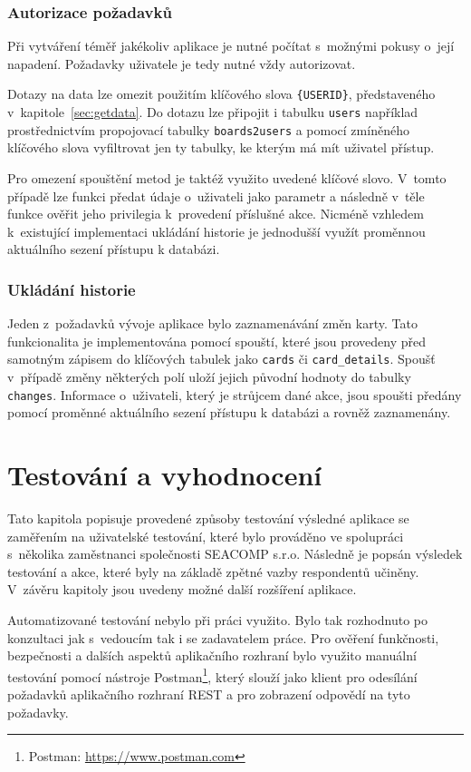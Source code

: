 \subsection{Autorizace požadavků}
Při vytváření téměř jakékoliv aplikace je nutné počítat s~možnými pokusy o~její napadení. Požadavky uživatele je tedy nutné vždy autorizovat. 

Dotazy na data lze omezit použitím klíčového slova \texttt{\{USERID\}}, představeného v~kapitole~\ref{sec:getdata}. Do dotazu lze připojit i tabulku \texttt{users} například prostřednictvím propojovací tabulky \texttt{boards2users} a pomocí zmíněného klíčového slova vyfiltrovat jen ty tabulky, ke kterým má mít uživatel přístup.

Pro omezení spouštění metod je taktéž využito uvedené klíčové slovo. V~tomto případě lze funkci předat údaje o~uživateli jako parametr a následně v~těle funkce ověřit jeho privilegia k~provedení příslušné akce. Nicméně vzhledem k~existující implementaci ukládání historie je jednodušší využít proměnnou aktuálního sezení přístupu k databázi.


\subsection{Ukládání historie}
Jeden z~požadavků vývoje aplikace bylo zaznamenávání změn karty. Tato funkcionalita je implementována pomocí spouští, které jsou provedeny před samotným zápisem do klíčových tabulek jako \texttt{cards} či \texttt{card\_details}. Spoušť v~případě změny některých polí uloží jejich původní hodnoty do tabulky \texttt{changes}. Informace o~uživateli, který je strůjcem dané akce, jsou spoušti předány pomocí proměnné aktuálního sezení přístupu k databázi a rovněž zaznamenány.


\chapter{Testování a vyhodnocení}
Tato kapitola popisuje provedené způsoby testování výsledné aplikace se zaměřením na uživatelské testování, které bylo prováděno ve spolupráci s~několika zaměstnanci společnosti SEACOMP s.r.o. Následně je popsán výsledek testování a akce, které byly na základě zpětné vazby respondentů učiněny. V~závěru kapitoly jsou uvedeny možné další rozšíření aplikace.

Automatizované testování nebylo při práci využito. Bylo tak rozhodnuto po konzultaci jak s~vedoucím tak i se zadavatelem práce. Pro ověření funkčnosti, bezpečnosti a dalších aspektů aplikačního rozhraní bylo využito manuální testování pomocí nástroje Postman\footnote{Postman: \url{https://www.postman.com}}, který slouží jako klient pro odesílání požadavků aplikačního rozhraní REST a pro zobrazení odpovědí na tyto požadavky.

